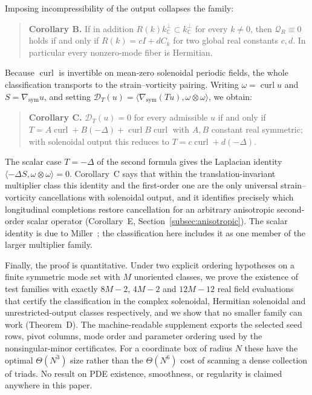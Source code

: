 \documentclass[11pt]{article}
\theoremstyle{definition}
\theoremstyle{remark}
\theoremstyle{plain}
\DeclareMathOperator{\curl}{curl}
\newcommand{\C}{\mathbb{C}}
\newcommand{\Qform}{\mathcal{Q}}
\newcommand{\Dform}{\mathcal{D}}
\newcommand{\Ck}{C_k}
\newcommand{\kperp}{k_{\C}^{\perp}}
\newcommand{\gsym}{\nabla_{\mathrm{sym}}}
\begin{document}
Imposing incompressibility of the output collapses the family:

\begin{quote}
\textbf{Corollary B.} If in addition $R(k)\kperp\subset\kperp$ for every
$k\ne0$, then $\Qform_{R}\equiv0$ holds if and only if $R(k)=cI+d\Ck$ for two
global real constants $c,d$. In particular every nonzero-mode fiber is
Hermitian.
\end{quote}

Because $\curl$ is invertible on mean-zero solenoidal periodic fields, the
whole classification transports to the strain--vorticity pairing. Writing
$\omega=\curl u$ and
$S=\gsym u$, and setting
$\Dform_{T}(u)=\langle\gsym(Tu),\omega\otimes\omega\rangle$, we obtain:

\begin{quote}
\textbf{Corollary C.} $\Dform_{T}(u)=0$ for every admissible $u$ if and only if
$T=A\curl+B(-\Delta)+\curl B\curl$ with $A,B$ constant real symmetric; with
solenoidal output this reduces to $T=c\curl+d(-\Delta)$.
\end{quote}

The scalar case $T=-\Delta$ of the second formula gives the Laplacian identity
$\langle-\Delta S,\omega\otimes\omega\rangle=0$. Corollary~C says that within
the translation-invariant multiplier class this identity and the first-order
one are the only universal strain--vorticity cancellations with solenoidal
output, and it identifies precisely which longitudinal completions restore
cancellation for an arbitrary anisotropic second-order scalar operator
(Corollary~E, Section~\ref{subsec:anisotropic}).
The scalar identity is due to Miller~\cite{Miller2026}; the classification
here includes it as one member of the larger multiplier family.

Finally, the proof is quantitative. Under two explicit ordering hypotheses on
a finite symmetric mode set with $M$ unoriented classes, we prove the existence
of test families with exactly $8M-2$, $4M-2$ and $12M-12$ real field
evaluations that certify the classification in the complex solenoidal,
Hermitian solenoidal and unrestricted-output classes respectively, and we show
that no smaller family can work (Theorem~D). The machine-readable supplement
exports the selected seed rows, pivot columns, mode order and parameter
ordering used by the nonsingular-minor certificates. For a coordinate box of radius $N$ these have the
optimal $\Theta(N^{3})$ size rather than the $\Theta(N^{6})$ cost of scanning
a dense collection of triads. No result on PDE existence, smoothness, or
regularity is claimed anywhere in this paper.
\end{document}

